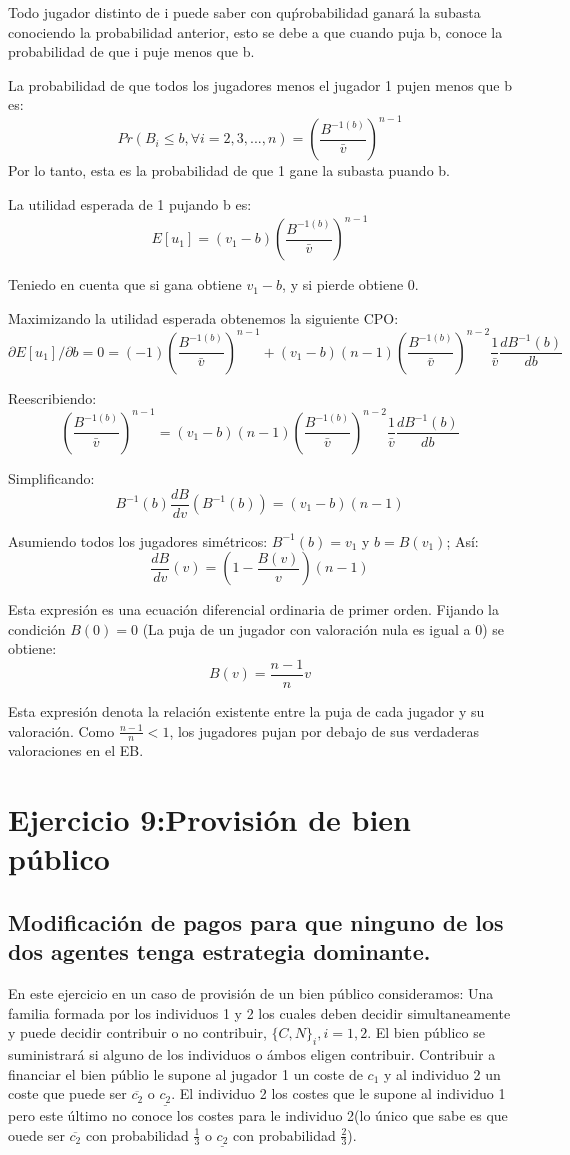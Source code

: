 \documentclass{article}
\begin{document}
Todo jugador distinto de i puede saber con qu\'probabilidad ganar\'a la subasta conociendo la probabilidad anterior, esto se debe a que cuando puja b, conoce la probabilidad de que i puje menos que b.

La probabilidad de que todos los jugadores menos el jugador 1 pujen menos que b es:
$$Pr(B_i\leq b, \forall i=2,3,...,n)=(\frac{B^{-1(b)}}{\bar{v}})^{n-1}$$
 Por lo tanto, esta es la probabilidad de que 1 gane la subasta puando b.

La utilidad esperada de 1 pujando b es:
$$E[u_1]=(v_1-b)(\frac{B^{-1(b)}}{\bar{v}})^{n-1}$$

Teniedo en cuenta que si gana obtiene $v_1-b$, y si pierde obtiene 0.

Maximizando la utilidad esperada obtenemos la siguiente CPO:
$$\partial E[u_1]/\partial b=0=(-1)(\frac{B^{-1(b)}}{\bar{v}})^{n-1}+(v_1-b)(n-1)(\frac{B^{-1(b)}}{\bar{v}})^{n-2}\frac{1}{\bar{v}}\frac{dB^{-1}(b)}{db}$$

Reescribiendo:
$$(\frac{B^{-1(b)}}{\bar{v}})^{n-1}=(v_1-b)(n-1)(\frac{B^{-1(b)}}{\bar{v}})^{n-2}\frac{1}{\bar{v}}\frac{dB^{-1}(b)}{db}$$

Simplificando:
$$B^{-1}(b)\frac{dB}{dv}(B^{-1}(b))=(v_1-b)(n-1)$$

Asumiendo todos los jugadores sim\'etricos: $B^{-1}(b)=v_1$ y $b=B(v_1)$; As\'i:
$$\frac{dB}{dv}(v)=(1-\frac{B(v)}{v})(n-1)$$

Esta expresi\'on es una ecuaci\'on diferencial ordinaria de primer orden. Fijando la condici\'on $B(0)=0$ (La puja de un jugador con valoraci\'on nula es igual a 0) se obtiene:
$$B(v)=\frac{n-1}{n}v$$

Esta expresi\'on denota la relaci\'on existente entre la puja de cada jugador y su valoraci\'on. Como $\frac{n-1}{n}<1$, los jugadores pujan por debajo de sus verdaderas valoraciones en el EB.



\section{Ejercicio 9:Provisi\'on de bien p\'ublico}
\subsection{Modificaci\'on de pagos para que ninguno de los dos agentes tenga estrategia dominante.}
En este ejercicio en un caso de provisión de un bien p\'ublico consideramos: Una familia formada por los individuos 1 y 2 los cuales deben decidir simultaneamente y puede decidir contribuir o no contribuir, $\{C,N\}_i, i=1,2$. El bien p\'ublico se suministrar\'a si alguno de los individuos o \'ambos eligen contribuir. Contribuir a financiar el bien p\'ublio le supone al jugador 1 un coste de $c_1$ y al individuo 2 un coste que puede ser $\overline{c_2}$ o $\underline{c_2}$. El individuo 2 los costes que le supone al individuo 1 pero este \'ultimo no conoce los costes para le individuo 2(lo único que sabe es que ouede ser $\overline{c_2}$ con probabilidad $\frac{1}{3}$ o $\underline{c_2}$ con probabilidad $\frac{2}{3}$).
\end{document}
